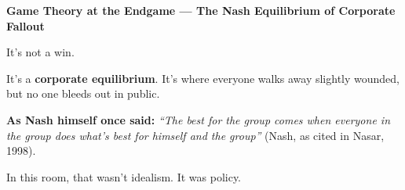 \begin{TechnicalSidebar}{\textbf{Game Theory at the Endgame --- The Nash Equilibrium of Corporate Fallout}}
  \medskip

  It’s not a win.

  \medskip

  It’s a \textbf{corporate equilibrium}.  
  It’s where everyone walks away slightly wounded,  
  but no one bleeds out in public.

  \medskip

  \textbf{As Nash himself once said:}  
  \textit{“The best for the group comes when everyone in the group does what’s best for 
  himself and the group”} (Nash, as cited in Nasar, 1998).

  \medskip

  In this room,  
  that wasn’t idealism.  
  It was policy.

\end{TechnicalSidebar}

